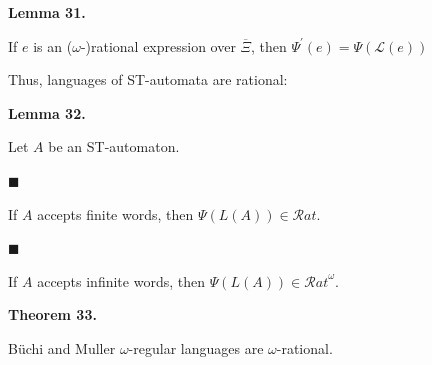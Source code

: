 \documentclass[10pt,a4paper]{article}
\begin{document}
 
 
\par\medskip\noindent\textbf{Lemma 31.}\par
 
 
If $e$ is an ($\omega$-)rational expression over $\overline{\Xi}$, then $\Psi^{\prime}(e)=\Psi(\mathcal{L}(e))$\par
 
 
 
 
Thus, languages of ST-automata are rational:\par
 
 
 
\par\medskip\noindent\textbf{Lemma 32.}\par
 
 
Let $A$ be an ST-automaton.\par
  
\par\noindent  $\blacksquare$ 
 
If $A$ accepts finite words, then $\Psi(L(A))\in\mathcal{R}at$.\par
 
 
 
\par\noindent  $\blacksquare$ 
 
If $A$ accepts infinite words, then $\Psi(L(A))\in{\mathcal{R}at}^{\omega}$.\par
 
 
  
 
 
 
\par\medskip\noindent\textbf{Theorem 33.}\par
 
 
Büchi and Muller $\omega$-regular languages are $\omega$-rational.\par
 
\end{document}
